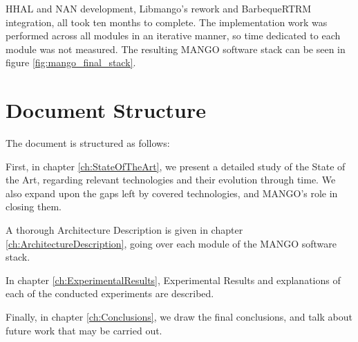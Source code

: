 HHAL and NAN development, Libmango's rework and BarbequeRTRM integration, all took ten months to complete. The implementation work was performed across all modules in an iterative manner, so time dedicated to each module was not measured.
The resulting MANGO software stack can be seen in figure \ref{fig:mango_final_stack}.

\section{Document Structure}

The document is structured as follows:

First, in chapter \ref{ch:StateOfTheArt}, we present a detailed study of the State of the Art, regarding relevant technologies and their evolution through time. We also expand upon the gaps left by covered technologies, and MANGO's role in closing them.

A thorough Architecture Description is given in chapter \ref{ch:ArchitectureDescription}, going over each module of the MANGO software stack.

In chapter \ref{ch:ExperimentalResults}, Experimental Results and explanations of each of the conducted experiments are described.

Finally, in chapter \ref{ch:Conclusions}, we draw the final conclusions, and talk about future work that may be carried out.


